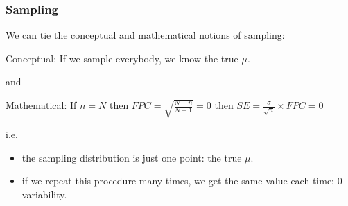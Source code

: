 \documentclass[handout]{beamer}
\newcommand{\blue}[1]{\textcolor{blue2}{#1}}
\begin{document}
%
%
%


\begin{frame}[fragile]
\frametitle{Sampling}
We can tie the \blue{conceptual} and \blue{mathematical} notions of sampling:  

\vspace{0.25cm}
\pause
\blue{Conceptual}:  If we sample everybody, we know the true $\mu$.
\begin{center}
\pause and
\end{center}
\blue{Mathematical}:  
If $n=N$ then $FPC = \sqrt{\frac{N-n}{N-1}} = 0$ then $SE = \frac{\sigma}{\sqrt{n}}\times FPC = 0$


\vspace{0.25cm}
\pause
i.e. 
\begin{itemize}
\item the sampling distribution is just one point: the true $\mu$.
\item if we repeat this procedure many times, we get the same value each time: 0 variability.
\end{itemize}


\end{frame}
\end{document}
